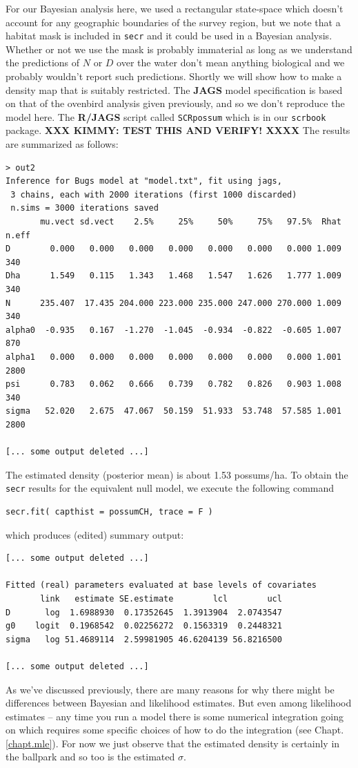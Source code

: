 For our Bayesian analysis here, we used a rectangular state-space which
doesn't account for any geographic boundaries of the survey region, but
we note that a habitat mask is included in {\tt secr} and it could be
used in a Bayesian analysis.
Whether or not we use the mask is
probably immaterial as long as we understand the predictions of $N$ or
$D$ over the water don't mean anything biological and we probably
wouldn't report such predictions. Shortly we will show how to make a
density map that is suitably restricted. The {\bf JAGS} model
specification is based on that of the ovenbird analysis given
previously, and so we don't reproduce the model here. The {\bf R/JAGS}
script called \mbox{\tt SCRpossum} which is in our \mbox{\tt scrbook}
package.  {\bf XXX KIMMY: TEST THIS AND VERIFY! XXXX}
The results are summarized as follows:
{\small
\begin{verbatim}
> out2
Inference for Bugs model at "model.txt", fit using jags,
 3 chains, each with 2000 iterations (first 1000 discarded)
 n.sims = 3000 iterations saved
       mu.vect sd.vect    2.5%     25%     50%     75%   97.5%  Rhat n.eff
D        0.000   0.000   0.000   0.000   0.000   0.000   0.000 1.009   340
Dha      1.549   0.115   1.343   1.468   1.547   1.626   1.777 1.009   340
N      235.407  17.435 204.000 223.000 235.000 247.000 270.000 1.009   340
alpha0  -0.935   0.167  -1.270  -1.045  -0.934  -0.822  -0.605 1.007   870
alpha1   0.000   0.000   0.000   0.000   0.000   0.000   0.000 1.001  2800
psi      0.783   0.062   0.666   0.739   0.782   0.826   0.903 1.008   340
sigma   52.020   2.675  47.067  50.159  51.933  53.748  57.585 1.001  2800

[... some output deleted ...]
\end{verbatim}
}

The estimated density (posterior mean) is about 1.53 possums/ha.
To obtain the \mbox{\tt secr} results for the equivalent null model, we execute the following command
\begin{verbatim}
secr.fit( capthist = possumCH, trace = F )
\end{verbatim}
which produces (edited) summary output:
\begin{verbatim}
[... some output deleted ...]

Fitted (real) parameters evaluated at base levels of covariates
       link   estimate SE.estimate        lcl        ucl
D       log  1.6988930  0.17352645  1.3913904  2.0743547
g0    logit  0.1968542  0.02256272  0.1563319  0.2448321
sigma   log 51.4689114  2.59981905 46.6204139 56.8216500

[... some output deleted ...]
\end{verbatim}
As we've discussed previously,
there are many reasons for why there might be differences 
between Bayesian and likelihood estimates.
But even among likelihood estimates -- any time you run a model there
is some numerical integration going on which requires some specific
choices of how to do the integration (see
Chapt. \ref{chapt.mle}). 
For now we just observe that the estimated density is certainly in the
ballpark and so too is the estimated $\sigma$.

